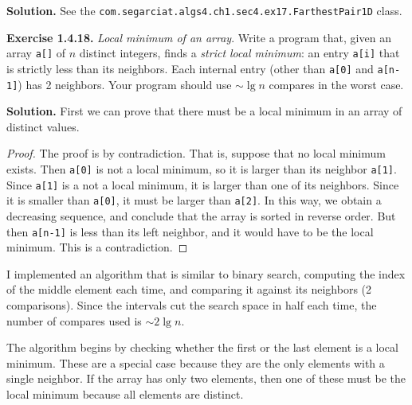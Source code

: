 \documentclass[12pt, a4paper]{article}
\newenvironment{ex}[2][Exercise]
{\par\medskip\noindent \textbf{#1 #2.}}
{\medskip}
\newenvironment{sol}[1][Solution]
{\par\medskip\noindent \textbf{#1.} }
{\medskip}
\begin{document}
	\begin{sol}
		See the \texttt{com.segarciat.algs4.ch1.sec4.ex17.FarthestPair1D} class.
	\end{sol}
	\begin{ex}{1.4.18}
		\emph{Local minimum of an array}. Write a program that, given an array \texttt{a[]}
		of $n$ distinct integers, finds a \emph{strict local minimum}: an entry \texttt{a[i]}
		that is strictly less than its neighbors. Each internal entry (other than \texttt{a[0]}
		and \texttt{a[n-1]}) has 2 neighbors. Your program should use $\sim \lg n$ compares in
		the worst case.
	\end{ex}
	\begin{sol}
		First we can prove that there must be a local minimum in an array of distinct values.
		\begin{proof}
			The proof is by contradiction. That is, suppose that no local minimum exists.
			Then \texttt{a[0]} is not a local minimum, so it is larger than its neighbor \texttt{a[1]}.
			Since \texttt{a[1]} is a not a local minimum, it is larger than one of its
			neighbors. Since it is smaller than \texttt{a[0]}, it must be larger than
			\texttt{a[2]}. In this way, we obtain a decreasing sequence, and conclude that
			the array is sorted in reverse order. But then \texttt{a[n-1]} is less than
			its left neighbor, and it would have to be the local minimum. This is a contradiction.
		\end{proof}
		I implemented an algorithm that is similar to binary search, computing the index of
		the middle element each time, and comparing it against its neighbors (2 comparisons).
		Since the intervals cut the search space in half each time, the number of compares
		used is $\sim 2 \lg n$.
		
		The algorithm begins by checking whether the first or the last element is a local minimum.
		These are a special case because they are the only elements with a single neighbor.
		If the array has only two elements, then one of these must be the local minimum because
		all elements are distinct.
		

\end{sol}
\end{document}
